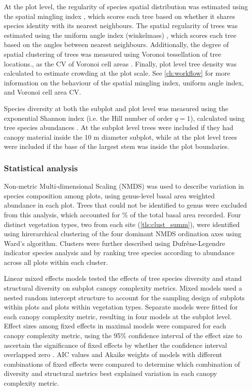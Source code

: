\begin{refsection}
At the plot level, the regularity of species spatial distribution was estimated using the spatial mingling index \citep{Gadow2002}, which scores each tree based on whether it shares species identity with its nearest neighbours. The spatial regularity of trees was estimated using the uniform angle index (winkelmass) \citep{Gadow2002}, which scores each tree based on the angles between nearest neighbours. Additionally, the degree of spatial clustering of trees was measured using Voronoi tessellation of tree locations., as the CV of Voronoi cell areas \citep{Ong2012}. Finally, plot level tree density was calculated to estimate crowding at the plot scale. See \autoref{ch:workflow} for more information on the behaviour of the spatial mingling index, uniform angle index, and Voronoi cell area CV.

Species diversity at both the subplot and plot level was measured using the exponential Shannon index (i.e. the Hill number of order $q=1$), calculated using tree species abundances \citep{Jost2006}. At the subplot level trees were included if they had canopy material inside the 10 m diameter subplot, while at the plot level trees were included if the base of the largest stem was inside the plot boundaries.

\subsubsection{Statistical analysis}
\label{tls:sssec:stats}

Non-metric Multi-dimensional Scaling (NMDS) was used to describe variation in species composition among plots, using genus-level basal area weighted abundance in each plot. Trees that could not be identified to genus were excluded from this analysis, which accounted for \perIndet{}\% of the total basal area recorded. Four distinct vegetation types, two from each site (\autoref{tls:clust_summ}), were identified using hirerarchical clustering of the four dominant NMDS ordination axes using Ward's algorithm. Clusters were further described using Dufr\^{e}ne-Legendre indicator species analysis and by ranking tree species according to abundance across all plots within each cluster. 

Linear mixed effects models tested the effects of tree species diversity and stand structural diversity on subplot canopy complexity metrics. Mixed models used a nested random intercept structure to account for the sampling design of subplots within plots and plots within vegetation types. Separate models were fitted for each canopy complexity metric, resulting in four models at the subplot level. Effect sizes among fixed effects in maximal models were compared for each canopy complexity metric, using the 95\% confidence interval of the effect size to ascertain the significance of fixed effects by whether the confidence interval overlapped zero \citep{Nakagawa2007}. AIC values and Akaike weights of models with different combinations of fixed effects were compared to determine which combination of diversity and structural metrics best explained variation in each canopy complexity metric. 


\end{refsection}
